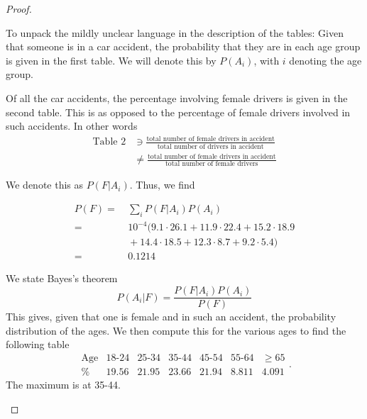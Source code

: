 \begin{proof}
	\begin{parts}
	\item To unpack the mildly unclear language in the description of the tables: Given that someone is in a car accident, the probability that they are in each age group is given in the first table. We will denote this by $P(A_i)$, with $i$ denoting the age group.
	
Of all the car accidents, the percentage involving female drivers is given in the second table. This is as opposed to the percentage of female drivers involved in such accidents. In other words
\begin{align*}
\text{Table 2} &\ni\frac{\text{total number of female drivers in accident}}{\text{total number of drivers in accident}}\\
&\neq \frac{\text{total number of female drivers in accident}}{\text{total number of female drivers}}
\end{align*}
	
	We denote this as $P(F|A_i)$. Thus, we find

	\begin{align*}
		P(F) =&~ \sum_i P(F|A_i)P(A_i)\\
		=&~ 10^{-4}(9.1\cdot 26.1 + 11.9 \cdot 22.4 + 15.2 \cdot 18.9 \\
		&~+ 14.4 \cdot 18.5+12.3\cdot 8.7 + 9.2 \cdot 5.4)\\
		=&~0.1214
	\end{align*}
	
\item We state Bayes's theorem
	\[
		P(A_i|F) = \frac{P(F|A_i)P(A_i)}{P(F)} 
	\]
	This gives, given that one is female and in such an accident, the probability distribution of the ages. We then compute this for the various ages to find the following table
		\[
	\begin{array}{c|cccccc}
		\text{Age} & 18\text{-}24 & 25\text{-}34 & 35\text{-}44 & 45\text{-}54 & 55\text{-}64 & \ge 65 \\
		\hline
		\% & 19.56 & 21.95 & 23.66 & 21.94 & 8.811 & 4.091
	\end{array}
	.\]
	The maximum is at 35-44.\qedhere
\end{parts}
\end{proof}
